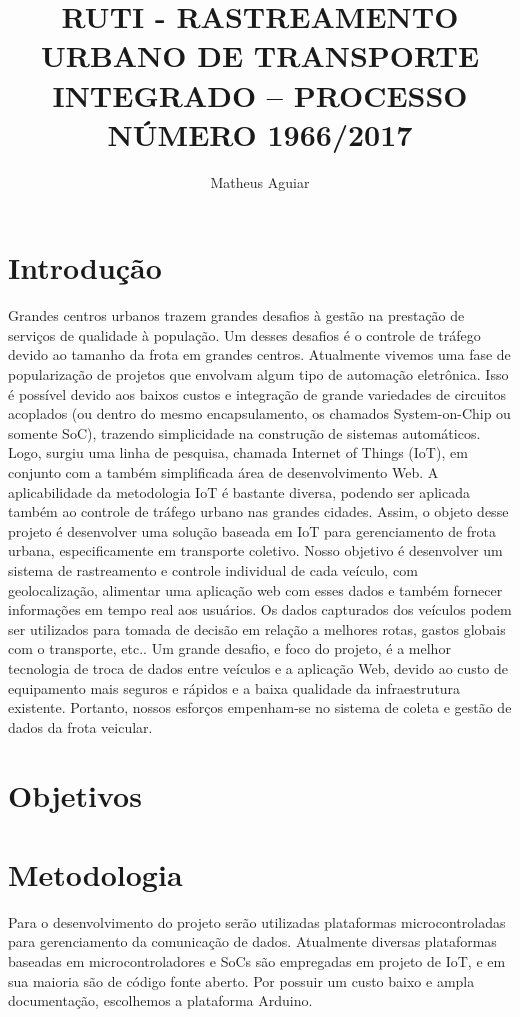 \documentclass[12pt,consuni]{uftpibic}
\title{RUTI - RASTREAMENTO URBANO DE TRANSPORTE INTEGRADO – PROCESSO NÚMERO 1966/2017}
\author{Matheus Aguiar}{Fagundes}
\begin{document}
\maketitle
\tableofcontents

\chapter{Introdução}

Grandes centros urbanos trazem grandes desafios à gestão na prestação de serviços de qualidade à população. Um desses desafios é o controle de tráfego devido ao tamanho da frota em grandes centros. Atualmente vivemos uma fase de popularização de projetos que envolvam algum tipo de automação eletrônica. Isso é possível devido aos baixos custos e integração de grande variedades de circuitos acoplados (ou dentro do mesmo encapsulamento, os chamados System-on-Chip ou somente SoC), trazendo simplicidade na construção de sistemas automáticos. Logo, surgiu uma linha de pesquisa, chamada Internet of Things (IoT), em conjunto com a também simplificada área de desenvolvimento Web. A aplicabilidade da metodologia IoT é bastante diversa, podendo ser aplicada também ao controle de tráfego urbano nas grandes cidades. Assim, o objeto desse projeto é desenvolver uma solução baseada em IoT para gerenciamento de frota urbana, especificamente em transporte coletivo. Nosso objetivo é desenvolver um sistema de rastreamento e controle individual de cada veículo, com geolocalização, alimentar uma aplicação web com esses dados e também fornecer informações em tempo real aos usuários. Os dados capturados dos veículos podem ser utilizados para tomada de decisão em relação a melhores rotas, gastos globais com o transporte, etc.. Um grande desafio, e foco do projeto, é a melhor tecnologia de troca de dados entre veículos e a aplicação Web, devido ao custo de equipamento mais seguros e rápidos e a baixa qualidade da infraestrutura existente. Portanto, nossos esforços empenham-se no sistema de coleta e gestão de dados da frota veicular. 

\chapter{Objetivos}


\chapter{Metodologia}

Para o desenvolvimento do projeto serão utilizadas plataformas microcontroladas para gerenciamento da comunicação de dados. Atualmente diversas plataformas baseadas em microcontroladores e SoCs são empregadas em projeto de IoT, e em sua maioria são de código fonte aberto. Por possuir um custo baixo e ampla documentação, escolhemos a plataforma Arduino.
\end{document}

